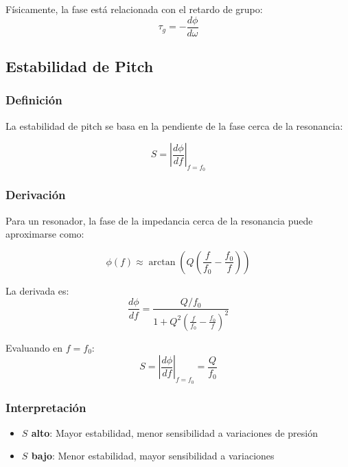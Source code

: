 \documentclass[12pt,a4paper,twocolumn]{article}
\newcommand{\freqzero}{f_0}
\begin{document}
Físicamente, la fase está relacionada con el retardo de grupo:
\begin{equation}
\tau_g = -\frac{d\phi}{d\omega}
\label{eq:retardo_grupo}
\end{equation}

\subsection{Estabilidad de Pitch}

\subsubsection{Definición}

La estabilidad de pitch se basa en la pendiente de la fase cerca de la resonancia:

\begin{equation}
S = \left|\frac{d\phi}{df}\right|_{f=\freqzero}
\label{eq:pitch_stability}
\end{equation}

\subsubsection{Derivación}

Para un resonador, la fase de la impedancia cerca de la resonancia puede aproximarse como:

\begin{equation}
\phi(f) \approx \arctan\left(Q\left(\frac{f}{\freqzero} - \frac{\freqzero}{f}\right)\right)
\label{eq:fase_aproximacion}
\end{equation}

La derivada es:
\begin{equation}
\frac{d\phi}{df} = \frac{Q/\freqzero}{1 + Q^2\left(\frac{f}{\freqzero} - \frac{\freqzero}{f}\right)^2}
\label{eq:derivada_fase}
\end{equation}

Evaluando en $f = \freqzero$:
\begin{equation}
S = \left|\frac{d\phi}{df}\right|_{f=\freqzero} = \frac{Q}{\freqzero}
\label{eq:estabilidad_final}
\end{equation}

\subsubsection{Interpretación}

\begin{itemize}
    \item \textbf{$S$ alto}: Mayor estabilidad, menor sensibilidad a variaciones de presión
    \item \textbf{$S$ bajo}: Menor estabilidad, mayor sensibilidad a variaciones
\end{itemize}
\end{document}
